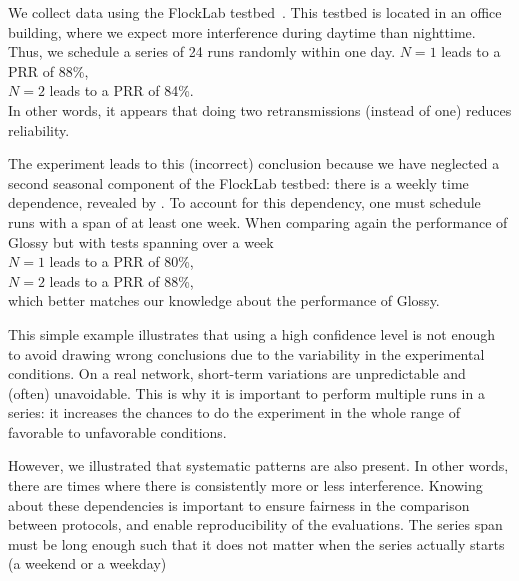 
We collect data using the FlockLab testbed~\cite{lim2013FlockLab}.
This testbed is located in an office building, where we expect more interference during daytime than nighttime.
Thus, we schedule a series of 24 runs randomly within one day.\linebreak
  \inlineitem $N=1$ leads to a PRR of 88\%,\\
  \inlineitem $N=2$ leads to a PRR of 84\%.\\
In other words, it appears that doing two retransmissions (instead of one) reduces reliability.

The experiment leads to this (incorrect) conclusion because we have neglected a second seasonal component of the FlockLab testbed: there is a weekly time dependence, revealed by .
To account for this dependency, one must schedule runs with a span of at least one week. When comparing again the performance of Glossy but with tests spanning over a week\\
  \inlineitem $N=1$ leads to a PRR of 80\%,\\
  \inlineitem $N=2$ leads to a PRR of 88\%,\\
which better matches our knowledge about the performance of Glossy.

This simple example illustrates that using a high confidence level is not enough to avoid drawing wrong conclusions due to the variability in the experimental conditions.
On a real network, short-term variations are unpredictable and (often) unavoidable. This is why it is important to perform multiple runs in a series: it increases the chances to do the experiment in the whole range of favorable to unfavorable conditions.

However, we illustrated that systematic patterns are also present. In other words, there are times where there is consistently more or less interference. Knowing about these dependencies is important to
  ensure fairness in the comparison between protocols, and
  enable reproducibility of the evaluations.
The series span must be long enough such that it does not matter when the series actually starts (\eg a weekend or a weekday)

